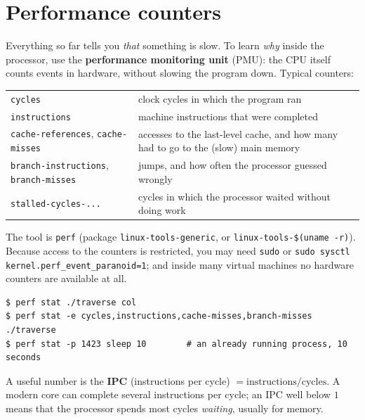\section*{Performance counters}
Everything so far tells you \emph{that} something is slow. To learn \emph{why} inside the processor, use the \textbf{performance monitoring unit} (PMU): the CPU itself counts events in hardware, without slowing the program down. Typical counters:
\begin{center}
\renewcommand{\arraystretch}{1.2}
\begin{tabular}{p{4.6cm}p{8.6cm}}
\texttt{cycles} & clock cycles in which the program ran\\
\texttt{instructions} & machine instructions that were completed\\
\texttt{cache-references}, \texttt{cache-misses} & accesses to the last-level cache, and how many had to go to the (slow) main memory\\
\texttt{branch-instructions}, \texttt{branch-misses} & jumps, and how often the processor guessed wrongly\\
\texttt{stalled-cycles-...} & cycles in which the processor waited without doing work\\
\end{tabular}
\end{center}
The tool is \texttt{perf} (package \texttt{linux-tools-generic}, or \texttt{linux-tools-\$(uname -r)}). Because access to the counters is restricted, you may need \texttt{sudo} or \verb|sudo sysctl kernel.perf_event_paranoid=1|; and inside many virtual machines no hardware counters are available at all.
\begin{verbatim}
$ perf stat ./traverse col
$ perf stat -e cycles,instructions,cache-misses,branch-misses ./traverse
$ perf stat -p 1423 sleep 10        # an already running process, 10 seconds
\end{verbatim}
A useful number is the \textbf{IPC} (instructions per cycle) $=\text{instructions}/\text{cycles}$. A modern core can complete several instructions per cycle; an IPC well below $1$ means that the processor spends most cycles \emph{waiting}, usually for memory.

